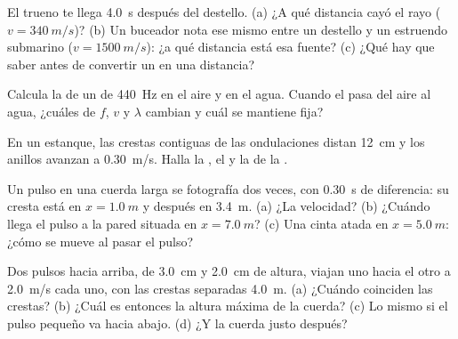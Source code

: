 \begin{exercise}[$\star$]\label{exo:g12:mechanical-waves:3}
El trueno te llega \qty{4.0}{s} después del destello. (a) ¿A qué
distancia cayó el rayo ($v = \qty{340}{m/s}$)? (b) Un buceador nota ese
mismo  entre un destello y un estruendo submarino
($v = \qty{1500}{m/s}$): ¿a qué distancia está esa fuente? (c) ¿Qué hay
que saber antes de convertir un  en una distancia?
\end{exercise}

\begin{exercise}[$\star$]\label{exo:g12:mechanical-waves:4}
Calcula la  de un  de \qty{440}{Hz} en el aire y
en el agua. Cuando el  pasa del aire al agua, ¿cuáles de $f$, $v$
y $\lambda$ cambian y cuál se mantiene fija?
\end{exercise}

\begin{exercise}[$\star$]\label{exo:g12:mechanical-waves:5}
En un estanque, las crestas contiguas de las ondulaciones distan
\qty{12}{cm} y los anillos avanzan a \qty{0.30}{m/s}. Halla la , el  y la  de la .
\end{exercise}

\begin{exercise}[$\star\star$]\label{exo:g12:mechanical-waves:6}
Un pulso en una cuerda larga se fotografía dos veces, con \qty{0.30}{s}
de diferencia: su cresta está en $x = \qty{1.0}{m}$ y después en
\qty{3.4}{m}. (a) ¿La velocidad? (b) ¿Cuándo llega el pulso a la pared
situada en $x = \qty{7.0}{m}$? (c) Una cinta atada en
$x = \qty{5.0}{m}$: ¿cómo se mueve al pasar el pulso?
\end{exercise}

\begin{exercise}[$\star\star$]\label{exo:g12:mechanical-waves:7}
Dos pulsos hacia arriba, de \qty{3.0}{cm} y \qty{2.0}{cm} de altura,
viajan uno hacia el otro a \qty{2.0}{m/s} cada uno, con las crestas
separadas \qty{4.0}{m}. (a) ¿Cuándo coinciden las crestas? (b) ¿Cuál es
entonces la altura máxima de la cuerda? (c) Lo mismo si el pulso pequeño
va hacia abajo. (d) ¿Y la cuerda justo después?
\end{exercise}

